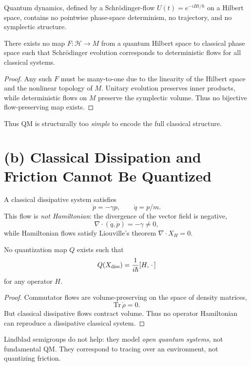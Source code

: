 \documentclass[12pt]{article}
\begin{document}
Quantum dynamics, defined by a Schrödinger-flow $U(t)=e^{-iHt/\hbar}$ on a Hilbert space, contains no pointwise phase-space determinism, no trajectory, and no symplectic structure.

\begin{theorem}
There exists no map $F:\mathcal H\to M$ from a quantum Hilbert space to classical phase space such that Schrödinger evolution corresponds to deterministic flows for all classical systems.
\end{theorem}

\begin{proof}
Any such $F$ must be many-to-one due to the linearity of the Hilbert space and the nonlinear topology of $M$.
Unitary evolution preserves inner products, while deterministic flows on $M$ preserve the symplectic volume.  
Thus no bijective flow-preserving map exists.
\end{proof}

Thus QM is structurally too \emph{simple} to encode the full classical structure.


\section{(b) Classical Dissipation and Friction Cannot Be Quantized}

A classical dissipative system satisfies
\[
\dot p = -\gamma p, \qquad \dot q = p/m.
\]
This flow is \emph{not Hamiltonian}: the divergence of the vector field is negative,
\[
\nabla \cdot (\dot q, \dot p) = -\gamma \neq 0,
\]
while Hamiltonian flows satisfy Liouville's theorem $\nabla\cdot X_H = 0$.

\begin{theorem}
No quantization map $Q$ exists such that  
\[
Q(X_{\rm diss}) = \frac1{i\hbar}[H,\, \cdot \,]
\]
for any operator $H$.
\end{theorem}

\begin{proof}
Commutator flows are volume-preserving on the space of density matrices,
\[
\mathrm{Tr}\,\dot\rho = 0.
\]
But classical dissipative flows contract volume.  
Thus no operator Hamiltonian can reproduce a dissipative classical system.
\end{proof}

Lindblad semigroups do not help: they model \emph{open quantum systems}, not fundamental QM.  
They correspond to tracing over an environment, not quantizing friction.
\end{document}
